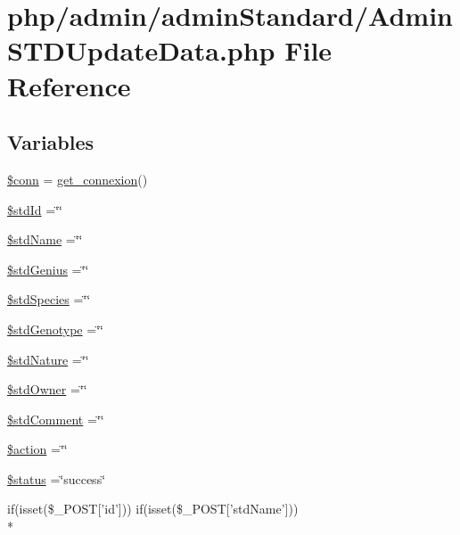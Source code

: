 \hypertarget{_admin_s_t_d_update_data_8php}{\section{php/admin/admin\-Standard/\-Admin\-S\-T\-D\-Update\-Data.php File Reference}
\label{_admin_s_t_d_update_data_8php}
}
\subsection*{Variables}
\begin{DoxyCompactItemize}
\item 
\hyperlink{_admin_s_t_d_update_data_8php_aa8a5a87b9c1a6a0819b88447cbe41877}{\$conn} = \hyperlink{php__functions_8php_ace18bc10f3fd08f92688ac743e0d8c2e}{get\-\_\-connexion}()
\item 
\hyperlink{_admin_s_t_d_update_data_8php_a35ce457f656c7fe2bf96a6813364da40}{\$std\-Id} =\char`\"{}\char`\"{}
\item 
\hyperlink{_admin_s_t_d_update_data_8php_a04bd6b914feb54eeeb053d3f690fea50}{\$std\-Name} =\char`\"{}\char`\"{}
\item 
\hyperlink{_admin_s_t_d_update_data_8php_a8964a2785066a92d7c0b11ff5a0261ea}{\$std\-Genius} =\char`\"{}\char`\"{}
\item 
\hyperlink{_admin_s_t_d_update_data_8php_a1d77174f9d4320006ec140e643f95324}{\$std\-Species} =\char`\"{}\char`\"{}
\item 
\hyperlink{_admin_s_t_d_update_data_8php_a26327dd0b8e0254d4910cf94160bb302}{\$std\-Genotype} =\char`\"{}\char`\"{}
\item 
\hyperlink{_admin_s_t_d_update_data_8php_a53b4aa93fde2c9f30c1eecf48472c395}{\$std\-Nature} =\char`\"{}\char`\"{}
\item 
\hyperlink{_admin_s_t_d_update_data_8php_ab6c56dc36eabf5961ac9ee1de239c3a4}{\$std\-Owner} =\char`\"{}\char`\"{}
\item 
\hyperlink{_admin_s_t_d_update_data_8php_a57ad1d0043a566efde8a4fb592d52b18}{\$std\-Comment} =\char`\"{}\char`\"{}
\item 
\hyperlink{_admin_s_t_d_update_data_8php_aa698a3e72116e8e778be0e95d908ee30}{\$action} =\char`\"{}\char`\"{}
\item 
\hyperlink{_admin_s_t_d_update_data_8php_a58391ea75f2d29d5d708d7050b641c33}{\$status} =\char`\"{}success\char`\"{}
\item 
if(isset(\$\-\_\-\-P\-O\-S\-T\mbox{[}'id'\mbox{]})) if(isset(\$\-\_\-\-P\-O\-S\-T\mbox{[}'std\-Name'\mbox{]})) \\*

\end{DoxyCompactItemize}
